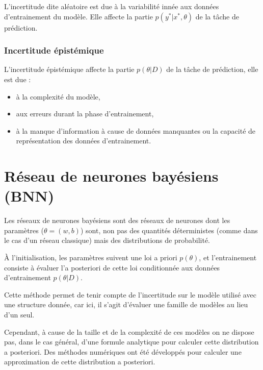 \documentclass[french,12pt]{article}
\let\oldsection\section%
\renewcommand{\section}{%
  \renewcommand{\theequation}{\thesection.\arabic{equation}}%
  \oldsection}%
\begin{document}
L'incertitude dite aléatoire est due à la variabilité innée aux données d'entrainement
du modèle. Elle affecte la partie $p(y^* | x^*, \theta)$ de la tâche de prédiction.

\subsubsection{Incertitude épistémique}

L'incertitude épistémique affecte la partie $p(\theta  | D)$ de la tâche de prédiction,
elle est due :

\begin{itemize}
    \item à la complexité du modèle,
    \item aux erreurs durant la phase d'entrainement,
    \item à la manque d'information à cause de données manquantes
          ou la capacité de représentation des données d'entrainement.
\end{itemize}

\pagebreak

\section{Réseau de neurones bayésiens (BNN)}


Les réseaux de neurones bayésiens sont des réseaux de neurones
dont les paramètres ($\theta = (w, b)$) sont, non pas des quantités déterministes (comme
dans le cas d'un réseau classique) mais des distributions de probabilité.

À l'initialisation, les paramètres suivent une loi a priori $p(\theta)$,
et l'entrainement consiste à évaluer l'a posteriori de cette loi conditionnée
aux données d'entrainement $p(\theta | D)$.

Cette méthode permet de tenir compte de l'incertitude sur le modèle utilisé
avec une structure donnée, car ici, il s'agit d'évaluer
une famille de modèles au lieu d'un seul.


Cependant, à cause de la taille et de la complexité de ces modèles
on ne dispose pas, dans le cas général, d'une formule analytique pour
calculer cette distribution a posteriori. Des méthodes numériques
ont été développés pour calculer une approximation de cette distribution a posteriori.
\end{document}
